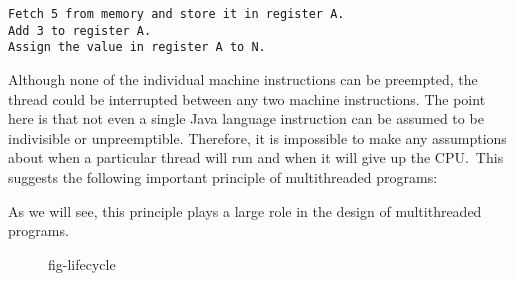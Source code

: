 \begin{jjjlisting}
\begin{lstlisting}
Fetch 5 from memory and store it in register A.
Add 3 to register A.
Assign the value in register A to N.
\end{lstlisting}
\end{jjjlisting}

\noindent Although none of the individual machine instructions can
be preempted, the thread could be interrupted between any two machine
instructions.  The point here is that not even a single Java language
instruction can be assumed to be indivisible or unpreemptible.
Therefore, it is impossible to make any assumptions about when a
particular thread will run and when it will give up the CPU.~This
suggests the following important principle of multithreaded programs:



\noindent As we will see, this principle plays a large role
in the design of multithreaded programs.

\begin{figure}[b]
 {fig-lifecycle}

\end{figure}

